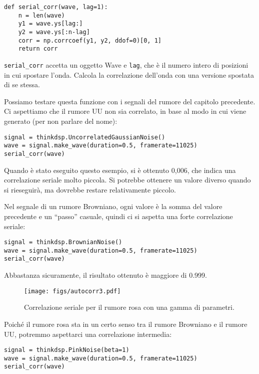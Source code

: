\documentclass[12pt,a4paper]{book}
\begin{document}
\begin{verbatim} 
def serial_corr(wave, lag=1):
    n = len(wave)
    y1 = wave.ys[lag:]
    y2 = wave.ys[:n-lag]
    corr = np.corrcoef(y1, y2, ddof=0)[0, 1]
    return corr
 \end{verbatim} 

\verb"serial_corr" accetta un oggetto Wave e {\tt lag}, che è il numero intero di posizioni in cui spostare l'onda. Calcola la correlazione dell'onda con una versione spostata di se stessa.

Possiamo testare questa funzione con i segnali del rumore del capitolo precedente. Ci aspettiamo che il rumore UU non sia correlato, in base al modo in cui viene generato (per non parlare del nome):

\begin{verbatim} 
signal = thinkdsp.UncorrelatedGaussianNoise()
wave = signal.make_wave(duration=0.5, framerate=11025)
serial_corr(wave)
 \end{verbatim} 

Quando è stato eseguito questo esempio, si è ottenuto 0,006, che indica una correlazione seriale molto piccola. Si potrebbe ottenere un valore diverso quando si rieseguirà, ma dovrebbe restare relativamente piccolo.

Nel segnale di un rumore Browniano, ogni valore è la somma del valore precedente e un ``passo'' casuale, quindi ci si aspetta una forte correlazione seriale:

\begin{verbatim} 
signal = thinkdsp.BrownianNoise()
wave = signal.make_wave(duration=0.5, framerate=11025)
serial_corr(wave)
 \end{verbatim} 

Abbastanza sicuramente, il risultato ottenuto è maggiore di 0.999.

\begin{figure} 

\centerline{\texttt{[image: figs/autocorr3.pdf]}} \caption{Correlazione seriale per il rumore rosa con una gamma di parametri.} \label{fig.autocorr3} \end{figure} 

Poiché il rumore rosa sta in un certo senso tra il rumore Browniano e il rumore UU, potremmo aspettarci una correlazione intermedia:

\begin{verbatim} 
signal = thinkdsp.PinkNoise(beta=1)
wave = signal.make_wave(duration=0.5, framerate=11025)
serial_corr(wave)
 \end{verbatim} 
\end{document}
